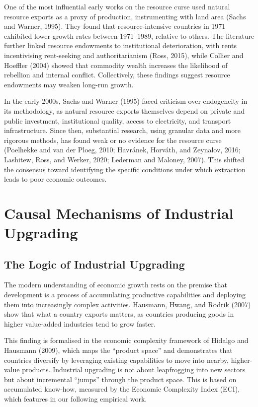 \documentclass[12pt,a4paper]{report}
\begin{document}
One of the most influential early works on the resource curse used natural resource exports as a proxy of production, instrumenting with land area (Sachs and Warner, 1995). They found that resource-intensive countries in 1971 exhibited lower growth rates between 1971--1989, relative to others. The literature further linked resource endowments to institutional deterioration, with rents incentivising rent-seeking and authoritarianism (Ross, 2015), while Collier and Hoeffler (2004) showed that commodity wealth increases the likelihood of rebellion and internal conflict. Collectively, these findings suggest resource endowments may weaken long-run growth.

In the early 2000s, Sachs and Warner (1995) faced criticism over endogeneity in its methodology, as natural resource exports themselves depend on private and public investment, institutional quality, access to electricity, and transport infrastructure. Since then, substantial research, using granular data and more rigorous methods, has found weak or no evidence for the resource curse (Poelhekke and van der Ploeg, 2010; Havr\'{a}nek, Horv\'{a}th, and Zeynalov, 2016; Lashitew, Ross, and Werker, 2020; Lederman and Maloney, 2007). This shifted the consensus toward identifying the specific conditions under which extraction leads to poor economic outcomes.


\section{Causal Mechanisms of Industrial Upgrading}

\subsection{The Logic of Industrial Upgrading}

The modern understanding of economic growth rests on the premise that development is a process of accumulating productive capabilities and deploying them into increasingly complex activities. Hausmann, Hwang, and Rodrik (2007) show that what a country exports matters, as countries producing goods in higher value-added industries tend to grow faster.

This finding is formalised in the economic complexity framework of Hidalgo and Hausmann (2009), which maps the ``product space'' and demonstrates that countries diversify by leveraging existing capabilities to move into nearby, higher-value products. Industrial upgrading is not about leapfrogging into new sectors but about incremental ``jumps'' through the product space. This is based on accumulated know-how, measured by the Economic Complexity Index (ECI), which features in our following empirical work.
\end{document}
